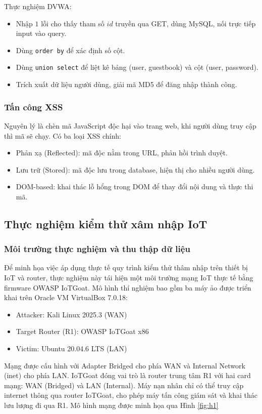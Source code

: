 \documentclass[conference]{IEEEtran}
\begin{document}
Thực nghiệm DVWA:
\begin{itemize}
    \item Nhập $1$ lỗi cho thấy tham số $id$ truyền qua GET, dùng MySQL, nối trực tiếp input vào query.

    \item Dùng \texttt{order by} để xác định số cột.

    \item Dùng \texttt{union select} để liệt kê bảng (user, guestbook) và cột (user, password).

    \item Trích xuất dữ liệu người dùng, giải mã MD5 để đăng nhập thành công.
\end{itemize}


\subsubsection{Tấn công XSS} Nguyên lý là chèn mã JavaScript độc hại vào trang web, khi người dùng truy cập thì mã sẽ chạy. Có ba loại XSS chính: 
\begin{itemize}
    \item Phản xạ (Reflected): mã độc nằm trong URL, phản hồi trình duyệt.
    \item Lưu trữ (Stored): mã độc lưu trong database, hiện thị cho nhiều người dùng.
    \item DOM-based: khai thác lỗ hổng trong DOM để thay đổi nội dung và thực thi mã.
\end{itemize}

\subsection{Thực nghiệm kiểm thử xâm nhập IoT}
\subsubsection{Môi trường thực nghiệm và thu thập dữ liệu} 
Để minh họa việc áp dụng thực tế quy trình kiểm thử thâm nhập trên thiết bị IoT và router, thực nghiệm này tái hiện một môi trường mạng IoT thực tế bằng firmware OWASP IoTGoat. Mô hình thí nghiệm bao gồm ba máy ảo được triển khai trên Oracle VM VirtualBox 7.0.18:
\begin{itemize}
    \item Attacker: Kali Linux 2025.3 (WAN)
    \item Target Router (R1): OWASP IoTGoat x86 
    \item Victim: Ubuntu 20.04.6 LTS (LAN)
\end{itemize}
Mạng được cấu hình với Adapter Bridged cho phía WAN và Internal Network (inet) cho phía LAN. IoTGoat đóng vai trò là router trung tâm R1 với hai card mạng: WAN (Bridged) và LAN (Internal). Máy nạn nhân chỉ có thể truy cập internet thông qua router IoTGoat, cho phép máy tấn công giám sát và khai thác lưu lượng đi qua R1. Mô hình mạng được minh họa qua Hình \ref{fig:h1}
\end{document}
